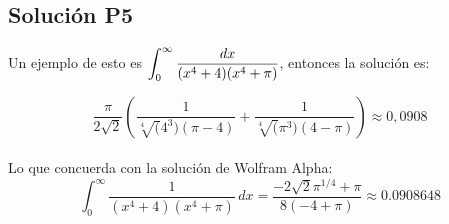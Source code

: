 \begin{CajaTitulo}{\begin{center}\subsection{Solución P5}\end{center}}
Un ejemplo de esto es $\mathlarger{\int_{0}^{\infty}\frac{dx}{(x^4 + 4)(x^4 + \pi)}} $, entonces la solución es: 

\[ \frac{\pi}{2\sqrt{2}}\left(\frac{1}{\sqrt[4](4^3)(\pi - 4)} + \frac{1}{\sqrt[4](\pi^3)(4 - \pi) }  \right) \approx 0,0908\]              
\\
Lo que concuerda con la solución de Wolfram Alpha:
\[\int_0^{\infty } \frac{1}{\left(x^4+4\right) \left(x^4+\pi \right)} \, dx   = \frac{-2 \sqrt{2} \pi ^{1/4}+\pi }{8 (-4+\pi )}\approx 0.0908648\]

\end{CajaTitulo}